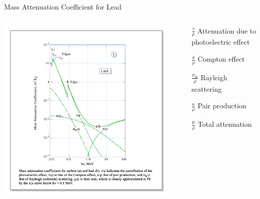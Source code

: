 \begin{frame}{Mass Attenuation Coefficient for Lead}
    \begin{columns}[c, onlytextwidth]
        \begin{column}{0.5\textwidth}
            \begin{center}\includegraphics[height=0.8\textheight, trim={2cm  3.5cm 2cm 2cm},clip ]{images/lead_attenuation_mit_opencourse_ware.jpg}\end{center}
        \end{column}\begin{column}{0.5\textwidth}
            \begin{itemize}
                \item[$ \frac{\tau}{\rho}$] Attenuation due to photoelectric effect
                \item[$ \frac{\sigma}{\rho}$] Compton effect
                \item[$ \frac{\sigma_R}{\rho}$] Rayleigh scattering
                \item[$ \frac{\kappa}{\rho}$] Pair production
                \item[$ \frac{\mu}{\rho}$] Total attenuation

            \end{itemize}

        \end{column}
    \end{columns}
\end{frame}


